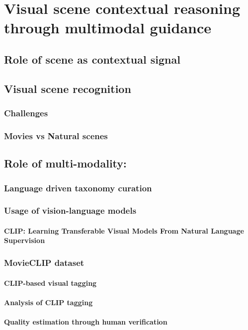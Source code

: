 \chapter{Visual scene contextual reasoning through multimodal guidance}
\section{Role of scene as contextual signal}
\section{Visual scene recognition}
\subsection{Challenges}
\subsection{Movies vs Natural scenes}
\section{Role of multi-modality:}
    \subsection{Language driven taxonomy curation}
    \subsection{Usage of vision-language models}
    \subsubsection{CLIP: Learning Transferable Visual Models From Natural Language Supervision}
    \subsection{MovieCLIP dataset}
    \subsubsection{CLIP-based visual tagging}
    \subsubsection{Analysis of CLIP tagging}
    \subsubsection{Quality estimation through human verification}
